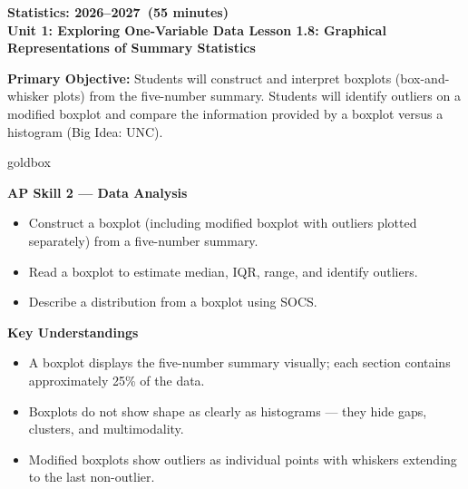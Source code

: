 \documentclass[10pt]{article}
\begin{document}
\def\CourseName{Statistics}
\def\SchoolYear{2026--2027}
\def\MeetingLength{55 minutes}
\newcommand{\UnitNumberName}{Unit 1: Exploring One-Variable Data \quad}
\newcommand{\LessonNumberName}{Lesson 1.8: Graphical Representations of Summary Statistics}

\begin{center}
    {\Large\bfseries \CourseName: \SchoolYear\ (\MeetingLength) \\
    {\small\bfseries \UnitNumberName \LessonNumberName}}
\end{center}

\begin{tcolorbox}[colback=sky,colframe=navy,boxrule=0.9pt,arc=2mm,
    left=2mm,right=2mm,top=1.5mm,bottom=1.5mm]
    \textbf{Primary Objective:} Students will construct and interpret boxplots (box-and-whisker
    plots) from the five-number summary. Students will identify outliers on a modified boxplot and
    compare the information provided by a boxplot versus a histogram (Big Idea: UNC).
\end{tcolorbox}

\boxguard
\begin{skillbox}{goldbox}
\begin{minipage}[t]{0.48\linewidth}
    \textbf{AP Skill 2 --- Data Analysis}
    \begin{itemize}
        \item Construct a boxplot (including modified boxplot with outliers plotted separately) from a five-number summary.
        \item Read a boxplot to estimate median, IQR, range, and identify outliers.
        \item Describe a distribution from a boxplot using SOCS.
    \end{itemize}
\end{minipage}
\hfill
\begin{minipage}[t]{0.48\linewidth}
    \textbf{Key Understandings}
    \begin{itemize}
        \item A boxplot displays the five-number summary visually; each section contains approximately 25\% of the data.
        \item Boxplots do not show shape as clearly as histograms --- they hide gaps, clusters, and multimodality.
        \item Modified boxplots show outliers as individual points with whiskers extending to the last non-outlier.
    \end{itemize}
\end{minipage}
\end{skillbox}
\end{document}
